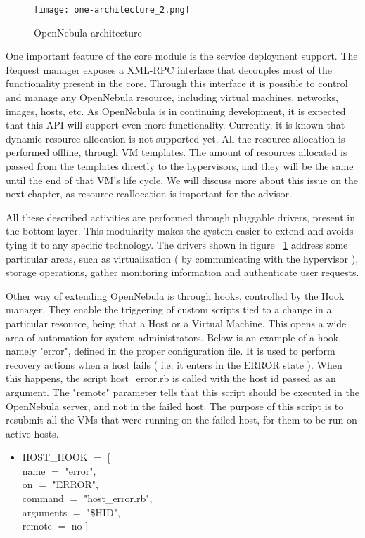 \begin{figure}[ht]
  \centering
 \texttt{[image: one-architecture\_2.png]}
  \caption{OpenNebula architecture}
  \label{fig:open_arch}
\end{figure}

One important feature of the core module is the service deployment support. The Request manager exposes a XML-RPC interface that decouples most of the functionality present in the core. Through this interface it is possible to control and manage any OpenNebula resource, including virtual machines, networks, images, hosts, etc. As OpenNebula is in continuing development, it is expected that this API will support even more functionality. Currently, it is known that dynamic resource allocation is not supported yet. All the resource allocation is performed offline, through VM templates. The amount of resources allocated is passed from the templates directly to the hypervisors, and they will be the same until the end of that VM's life cycle. We will discuss more about this issue on the next chapter, as resource reallocation is important for the advisor.

All these described activities are performed through pluggable drivers, present in the bottom layer. This modularity makes the system easier to extend and avoids tying it to any specific technology. The drivers shown in figure ~\ref{fig:open_arch}  address some particular areas, such as virtualization ( by communicating with the hypervisor ), storage operations, gather monitoring information and authenticate user requests.

Other way of extending OpenNebula is through hooks, controlled by the Hook manager. They enable the triggering of custom scripts tied to a change in a particular resource, being that a Host or a Virtual Machine. This opens a wide area of automation for system administrators. Below is an example of a hook, namely "error", defined in the proper configuration file. It is used to perform recovery actions when a host fails ( i.e. it enters in the ERROR state ). When this happens, the script host\_error.rb is called with the host id passed as an argument. The "remote" parameter tells that this script should be executed in the OpenNebula server, and not in the failed host. The purpose of this script is to resubmit all the VMs that were running on the failed host, for them to be run on active hosts. 

\begin{itemize}
 \item HOST\_HOOK $=$ [ \\
    name      $=$ "error",\\
    on        $=$ "ERROR",\\
    command   $=$ "host\_error.rb",\\
    arguments $=$ "\$HID",\\
    remote    $=$ no ]\\
\end{itemize}

